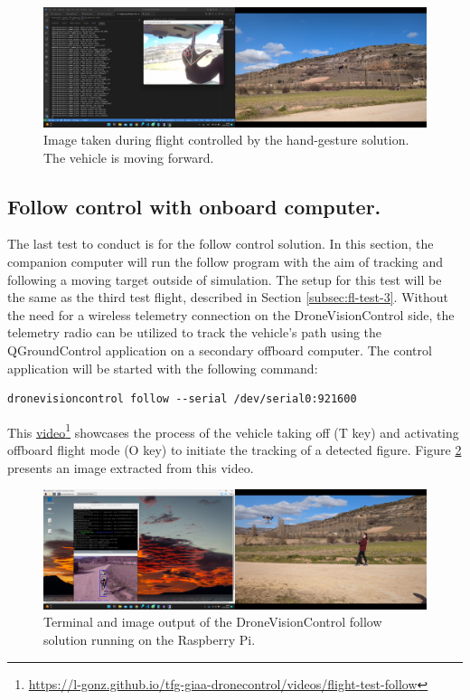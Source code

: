 \begin{figure}[H]
  \centering
  \includegraphics[width=\textwidth, keepaspectratio]{img/video-field-test-hand.png}
  \caption{Image taken during flight controlled by the hand-gesture solution. The vehicle is moving forward.}
  \label{fig:flight-test-hand}
\end{figure}


\subsection{Follow control with onboard computer.}
\label{subsec:fl-test-5}

The last test to conduct is for the follow control solution. In this section, the companion computer will run the follow program with the aim of tracking and following a moving target outside of simulation. The setup for this test will be the same as the third test flight, described in Section \ref{subsec:fl-test-3}. Without the need for a wireless telemetry connection on the DroneVisionControl side, the telemetry radio can be utilized to track the vehicle's path using the QGroundControl application on a secondary offboard computer. The control application will be started with the following command:
\begin{verbatim}
dronevisioncontrol follow --serial /dev/serial0:921600
\end{verbatim}
This \href{https://l-gonz.github.io/tfg-giaa-dronecontrol/videos/flight-test-follow}{video}\footnote{\url{https://l-gonz.github.io/tfg-giaa-dronecontrol/videos/flight-test-follow}} showcases the process of the vehicle taking off (T key) and activating offboard flight mode (O key) to initiate the tracking of a detected figure. Figure \ref{fig:flight-test-follow} presents an image extracted from this video.


\begin{figure}[H]
  \centering
  \includegraphics[width=\textwidth, keepaspectratio]{img/video-field-test-follow.png}
  \caption{Terminal and image output of the DroneVisionControl follow solution running on the Raspberry Pi.}
  \label{fig:flight-test-follow}
\end{figure}


